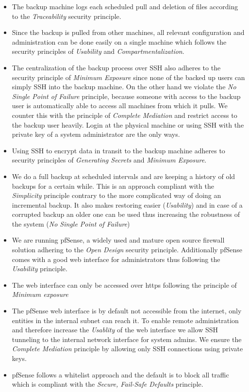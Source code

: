 \documentclass[english]{article}
\begin{document}
\begin{itemize}
    \item The backup machine logs each scheduled pull and deletion of files according to the \emph{Traceability} security principle.
    \item Since the backup is pulled from other machines, all relevant configuration and administration can  be done easily on a single machine which follows the security principles of \emph{Usability} and \emph{Compartmentalization}.
    \item The centralization of the backup process over SSH also adheres to the security principle of \emph{Minimum Exposure} since none of the backed up users can simply SSH into the backup machine. On the other hand we violate the \emph{No Single Point of Failure} principle, because someone with access to the backup user is automatically able to access all machines from which it pulls. We counter this with the principle of \emph{Complete Mediation} and restrict access to the backup user heavily. Login at the physical machine or using SSH with the private key of a system administrator are the only ways.
    \item Using SSH to encrypt data in transit to the backup machine adheres to security principles of \emph{Generating Secrets} and \emph{Minimum Exposure}. 
    \item We do a full backup at scheduled intervals and are keeping a history of old backups for a certain while. This is an approach compliant with the \emph{Simplicity} principle contrary to the more complicated way of doing an incremental backup. It also makes restoring easier (\emph{Usability}) and in case of a corrupted backup an older one can be used thus increasing the robustness of the system (\emph{No Single Point of Failure})
\end{itemize}


\begin{itemize}
    \item We are running pfSense, a widely used and mature open source firewall solution adhering to the \emph{Open Design} security principle. Additionally pfSense comes with a good web interface for administrators thus following the \emph{Usability} principle.
    \item The web interface can only be accessed over https following the principle of \emph{Minimum exposure}
    \item The pfSense web interface is by default not accessible from the internet, only entities in the internal subnet can reach it. To enable remote administration and therefore increase the \emph{Usablity} of the web interface we allow SSH tunneling to the internal network interface for system admins. We ensure the \emph{Complete Mediation} principle by allowing only SSH connections using private keys.
    \item pfSense follows a whitelist approach and the default is to block all traffic which is compliant with the \emph{Secure, Fail-Safe Defaults} principle.
\end{itemize}
\end{document}
